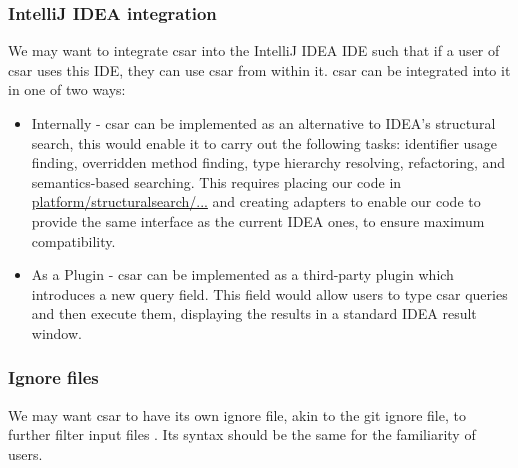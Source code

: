 \documentclass[12pt, letterpaper]{article}
\begin{document}
\subsubsection{IntelliJ IDEA integration}
We may want to integrate csar into the IntelliJ IDEA IDE such that if a user of csar uses this IDE, they can use csar from within it. 
csar can be integrated into it in one of two ways:
\begin{itemize}
  \item Internally - csar can be implemented as an alternative to IDEA's structural search,
  this would enable it to carry out the following tasks:
  identifier usage finding, overridden method finding, type hierarchy resolving, refactoring, and semantics-based searching.
  This requires placing our code in \href{https://github.com/JetBrains/intellij-community/tree/master/platform/structuralsearch/source/com/intellij/structuralsearch}{platform/structuralsearch/...} and creating adapters to enable our code to provide the same interface as the current IDEA ones, to ensure maximum compatibility.
  \item As a Plugin - csar can be implemented as a third-party plugin which introduces a new query field.
  This field would allow users to type csar queries and then execute them, displaying the results in a standard IDEA result window.
\end{itemize}

\subsubsection{Ignore files}
We may want csar to have its own ignore file, akin to the git ignore file, to further filter input files \autocite{gitscmgitignore}.
Its syntax should be the same for the familiarity of users.
\end{document}
